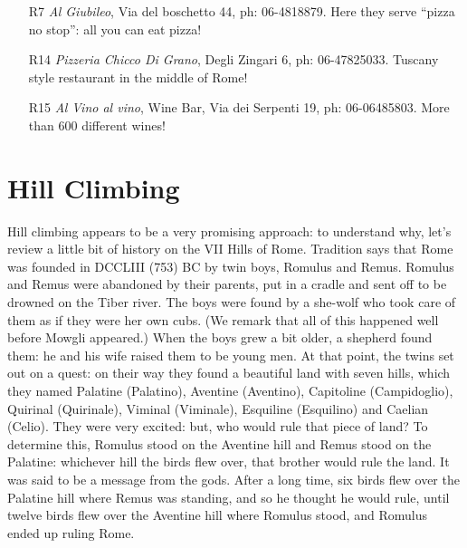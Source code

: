 \documentclass[twocolumn,10pt]{article}
\begin{document}
\begin{enumerate}
\item[R7] {\em Al Giubileo}, Via del boschetto 44, ph: 
06-4818879. Here they serve ``pizza no stop'': all you can eat pizza!



\item[R14] {\em Pizzeria Chicco Di Grano}, Degli Zingari 6, ph: 06-47825033. Tuscany style restaurant in the middle of Rome!

\item[R15] {\em Al Vino al vino}, Wine Bar, Via dei Serpenti 19, ph: 06-06485803. More than 600 different wines! 

\end{enumerate}

















\section{Hill Climbing}
\label{se:hill-climbing}

Hill climbing appears to be a very promising approach: to understand 
why, let's review a little bit of history on the VII Hills of Rome.
Tradition says that Rome was founded in DCCLIII (753) BC by twin 
boys, Romulus and Remus. Romulus and Remus were abandoned by their 
parents, put in a cradle and sent off to be drowned on the Tiber 
river. The boys were found by a she-wolf who took care of them as if 
they were her own cubs. (We remark that all of this happened well 
before Mowgli appeared.) When the boys grew a bit older, a shepherd 
found them: he and his wife raised them to be young men. At that 
point, the twins set out on a quest: on their way they found a 
beautiful land with seven hills, which they named Palatine 
(Palatino), Aventine (Aventino), Capitoline (Campidoglio), Quirinal 
(Quirinale), Viminal (Viminale), Esquiline (Esquilino) and Caelian 
(Celio). They were very excited: but, who would rule that piece of 
land? To determine this, Romulus stood on the Aventine hill 
and Remus stood on the Palatine: whichever hill the birds flew over, 
that brother would rule the land. It was said to be a message from 
the gods. After a long time, six birds flew over the Palatine hill 
where Remus was standing, and so he thought he would rule, until 
twelve birds flew over the Aventine hill where Romulus stood, and 
Romulus ended up ruling Rome. 
\end{document}
